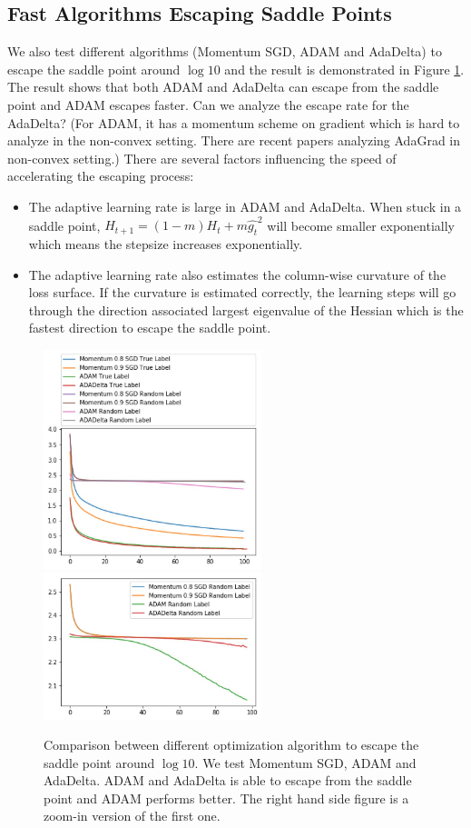 \documentclass{article}
\theoremstyle{plain}
\theoremstyle{definition}
\begin{document}
\subsection{Fast Algorithms Escaping Saddle Points}

We also test different algorithms (Momentum SGD, ADAM and AdaDelta) to escape the saddle point around $\log 10$ and the result is demonstrated in Figure \ref{optsadd}. The result shows that both ADAM and AdaDelta can escape from the saddle point and ADAM escapes faster. Can we analyze the escape rate for the AdaDelta? (For ADAM, it has a momentum scheme on gradient which is hard to analyze in the non-convex setting. There are recent papers analyzing AdaGrad in non-convex setting.) There are several factors influencing the speed of accelerating the escaping process:

\begin{itemize}
	\item The adaptive learning rate is large in ADAM and AdaDelta. When stuck in a saddle point, $H_{t+1}=(1-m)H_t+m\hat{g_t}^2$ will become smaller exponentially which means the stepsize increases exponentially.
	\item The adaptive learning rate also estimates the column-wise curvature of the loss surface. If the curvature is estimated correctly, the learning steps will go through the direction associated largest eigenvalue of the Hessian which is the fastest direction to escape the saddle point.
\end{itemize}

\begin{figure}[H]
	\centering
	\includegraphics[width=2.5in]{opt.jpg}
	\includegraphics[width=2.5in]{saddle.jpg}
	\caption{Comparison between different optimization algorithm to escape the saddle point around $\log 10$. We test Momentum SGD, ADAM and AdaDelta. ADAM and AdaDelta is able to escape from the saddle point and ADAM performs better. The right hand side figure is a zoom-in version of the first one.}
	\label{optsadd}
\end{figure}
\end{document}
